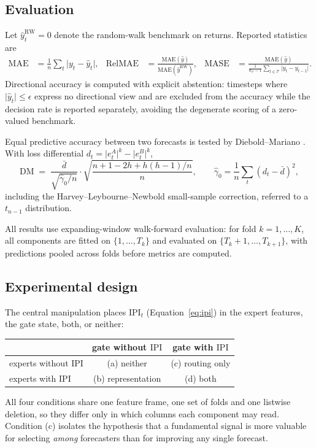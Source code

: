 \subsection{Evaluation}

Let $\hat{y}^{\mathrm{RW}}_t = 0$ denote the random-walk benchmark on returns.
Reported statistics are
\begin{align}
\mathrm{MAE} &= \frac{1}{n}\sum_t \lvert y_t-\hat{y}_t\rvert,
&
\mathrm{RelMAE} &= \frac{\mathrm{MAE}(\hat{y})}{\mathrm{MAE}(\hat{y}^{\mathrm{RW}})},
&
\mathrm{MASE} &= \frac{\mathrm{MAE}(\hat{y})}{\frac{1}{n_{\mathcal{T}}-1}\sum_{t\in\mathcal{T}}\lvert y_t-y_{t-1}\rvert}.
\end{align}
Directional accuracy is computed with explicit abstention: timesteps where
$\lvert \hat{y}_t\rvert \le \epsilon$ express no directional view and are excluded
from the accuracy while the decision rate is reported separately, avoiding the
degenerate scoring of a zero-valued benchmark.

Equal predictive accuracy between two forecasts is tested by
Diebold--Mariano \cite{diebold1995}. With loss differential
$d_t = \lvert e^{A}_t\rvert^{k} - \lvert e^{B}_t\rvert^{k}$,
\begin{equation}
\mathrm{DM} \;=\; \frac{\bar{d}}{\sqrt{\hat{\gamma}_0/n}}
\cdot
\sqrt{\frac{n+1-2h+h(h-1)/n}{n}},
\qquad
\hat{\gamma}_0 = \frac{1}{n}\sum_t (d_t-\bar{d})^2 ,
\end{equation}
including the Harvey--Leybourne--Newbold small-sample correction, referred to a
$t_{n-1}$ distribution.

All results use expanding-window walk-forward evaluation: for fold
$k=1,\dots,K$, all components are fitted on $\{1,\dots,T_k\}$ and evaluated on
$\{T_k+1,\dots,T_{k+1}\}$, with predictions pooled across folds before metrics are
computed.

\subsection{Experimental design}

The central manipulation places $\mathrm{IPI}_t$ (Equation~\ref{eq:ipi}) in the
expert features, the gate state, both, or neither:
\begin{center}
\begin{tabular}{lcc}
\hline
& gate without $\mathrm{IPI}$ & gate with $\mathrm{IPI}$ \\
\hline
experts without $\mathrm{IPI}$ & (a) neither & (c) routing only \\
experts with $\mathrm{IPI}$ & (b) representation & (d) both \\
\hline
\end{tabular}
\end{center}
All four conditions share one feature frame, one set of folds and one listwise
deletion, so they differ only in which columns each component may read. Condition
(c) isolates the hypothesis that a fundamental signal is more valuable for
selecting \emph{among} forecasters than for improving any single forecast.
